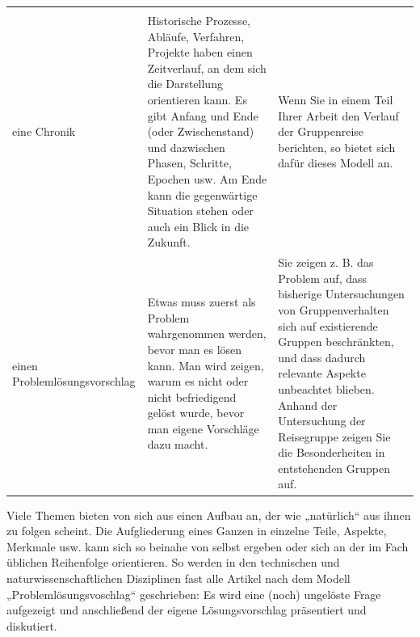 \documentclass[]{book}
\theoremstyle{definition}
\theoremstyle{definition}
\theoremstyle{definition}
\theoremstyle{remark}
\begin{document}
\begin{longtable}[]{@{}lll@{}}
\begin{minipage}[t]{0.41\columnwidth}
\end{minipage}\tabularnewline
\begin{minipage}[t]{0.14\columnwidth}\raggedright\strut
eine Chronik\strut
\end{minipage} & \begin{minipage}[t]{0.36\columnwidth}\raggedright\strut
Historische Prozesse, Abläufe, Verfahren, Projekte haben einen
Zeitverlauf, an dem sich die Darstellung orientieren kann. Es gibt
Anfang und Ende (oder Zwischenstand) und dazwischen Phasen, Schritte,
Epochen usw. Am Ende kann die gegenwärtige Situation stehen oder auch
ein Blick in die Zukunft.\strut
\end{minipage} & \begin{minipage}[t]{0.41\columnwidth}\raggedright\strut
Wenn Sie in einem Teil Ihrer Arbeit den Verlauf der Gruppenreise
berichten, so bietet sich dafür dieses Modell an. \vspace{-6mm}\strut
\end{minipage}\tabularnewline
\begin{minipage}[t]{0.14\columnwidth}\raggedright\strut
einen Problemlösungsvorschlag\strut
\end{minipage} & \begin{minipage}[t]{0.36\columnwidth}\raggedright\strut
Etwas muss zuerst als Problem wahrgenommen werden, bevor man es lösen
kann. Man wird zeigen, warum es nicht oder nicht befriedigend gelöst
wurde, bevor man eigene Vorschläge dazu macht.\strut
\end{minipage} & \begin{minipage}[t]{0.41\columnwidth}\raggedright\strut
Sie zeigen z. B. das Problem auf, dass bisherige Untersuchungen von
Gruppenverhalten sich auf existierende Gruppen beschränkten, und dass
dadurch relevante Aspekte unbeachtet blieben. Anhand der Untersuchung
der Reisegruppe zeigen Sie die Besonderheiten in entstehenden Gruppen
auf.\strut
\end{minipage}\tabularnewline
\bottomrule
\end{longtable}

Viele Themen bieten von sich aus einen Aufbau an, der wie „natürlich``
aus ihnen zu folgen scheint. Die Aufgliederung eines Ganzen in einzelne
Teile, Aspekte, Merkmale usw. kann sich so beinahe von selbst ergeben
oder sich an der im Fach üblichen Reihenfolge orientieren. So werden in
den technischen und naturwissenschaftlichen Disziplinen fast alle
Artikel nach dem Modell „Problemlösungsvoschlag`` geschrieben: Es wird
eine (noch) ungelöste Frage aufgezeigt und anschließend der eigene
Lösungsvorschlag präsentiert und diskutiert.
\end{document}
